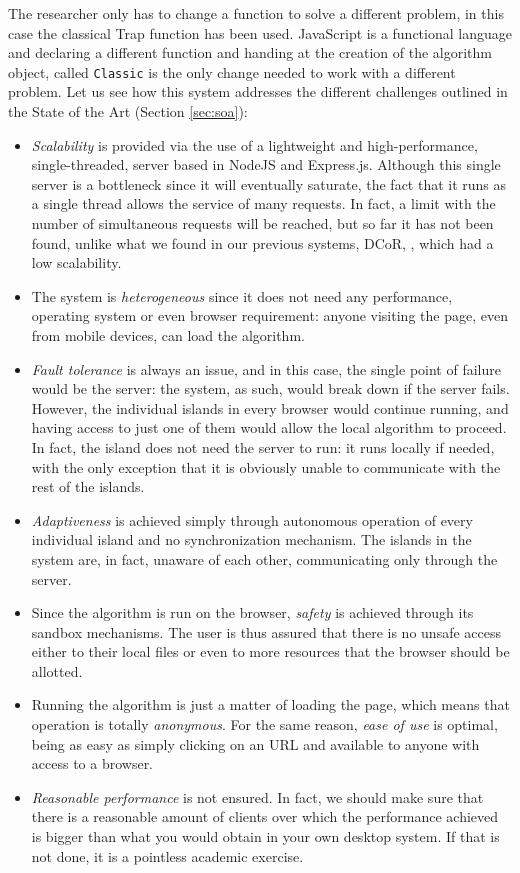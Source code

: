 \documentclass[journal,onecolumn]{IEEEtran}
\begin{document}
The researcher only has to change a function to solve a different
problem, in this case the classical Trap function \cite{Ackley1987} has been
used. JavaScript is a functional language and declaring a different
function and handing at the creation of the algorithm object, called
{\tt Classic} is the only change needed to work with a different
problem. Let us see how this system addresses the different challenges
outlined in the State of the Art (Section \ref{sec:soa}):\begin{itemize}
\item {\em Scalability} is provided via the use of a lightweight and
  high-performance, single-threaded, server based in NodeJS and
  Express.js. Although this single server is a bottleneck since it
  will eventually saturate, the fact that it runs as a single thread
  allows the service of many requests. In fact, a limit with the
  number of simultaneous requests will be reached, but so far it has
  not been found, unlike what we found in our previous systems, DCoR,
  \cite{gecco07:workshop:dcor}, which had a low scalability.
\item The system is {\em heterogeneous} since it does not need any
  performance, operating system or even browser requirement: anyone
  visiting the page, even from mobile devices, can load the algorithm.
\item {\em Fault tolerance} is always an issue, and in this case, the
  single point of failure would be the server: the system, as such,
  would break down if the server fails. However, the individual
  islands in every browser would continue running, and having access
  to just one of them would allow the local algorithm to proceed. In
  fact, the island does not need the server to run: it runs locally if
  needed, with the only exception that it is obviously unable to
  communicate with the rest of the islands.
\item {\em Adaptiveness} is achieved simply through autonomous
  operation of every individual island and no synchronization
  mechanism. The islands in the system are, in fact, unaware of each
  other, communicating only through the server.
\item Since the algorithm is run on the browser, {\em safety} is
  achieved through its sandbox mechanisms. The user is thus assured
  that there is no unsafe access either to their local files or even
  to more resources that the browser should be allotted.
\item Running the algorithm is just a matter of loading the page,
  which means that operation is totally {\em anonymous}. For the same
  reason, {\em ease of use} is optimal, being as easy as simply
  clicking on an URL and available to anyone with access to a browser.
\item {\em Reasonable performance} is not ensured. In fact, we should
  make sure that there is a reasonable amount of clients over which
  the performance achieved is bigger than what you would obtain in
  your own desktop system. If that is not done, it is a pointless
  academic exercise.
\end{itemize}
\end{document}
